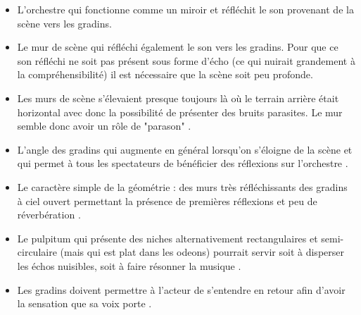 \begin{itemize}
\item L'orchestre qui fonctionne comme un miroir et réfléchit le son provenant de la scène vers les gradins.
\item Le mur de scène qui réfléchi également le son vers les gradins. Pour que ce son réfléchi ne soit pas présent sous forme d'écho (ce qui nuirait grandement à la compréhensibilité) il est nécessaire que la scène soit peu profonde.
\item Les murs de scène s'élevaient presque toujours là où le terrain arrière était horizontal avec donc la possibilité de présenter des bruits parasites. Le mur semble donc avoir un rôle de "parason" \cite[p.38]{canac}.
\item L'angle des gradins qui augmente en général lorsqu'on s'éloigne de la scène et qui permet à tous les spectateurs de bénéficier des réflexions sur l'orchestre \cite[p.103-109]{canac}.
\item Le caractère simple de la géométrie : des murs très réfléchissants des gradins à ciel ouvert permettant la présence de premières réflexions et peu de réverbération \cite[p.33]{canac}.
\item Le \gls{pulpitum} qui présente des niches alternativement rectangulaires et semi-circulaire (mais qui est plat dans les \glspl{odeon}) pourrait servir soit à disperser les échos nuisibles, soit à faire résonner la musique \cite[p.38]{canac}.
\item Les gradins doivent permettre à l'acteur de s'entendre en retour afin d'avoir la sensation que sa voix porte \cite[p.42 - tab.II-4]{canac}.
\end{itemize}
